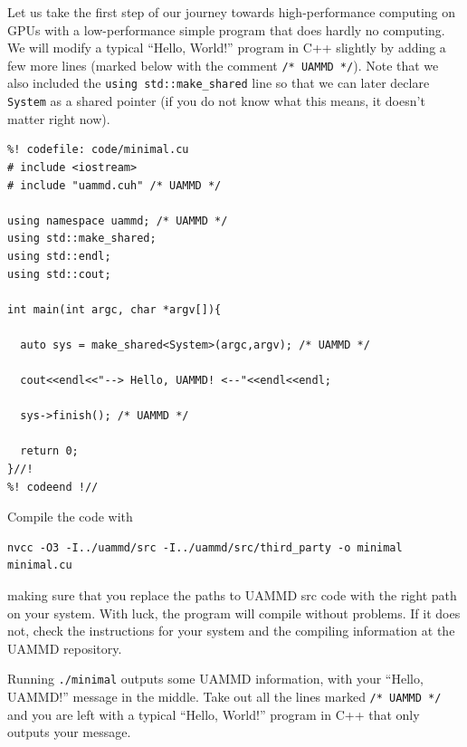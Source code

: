 
Let us take the first step of our journey towards high-performance computing on
GPUs with a low-performance simple program that does hardly no computing. We
will modify a typical ``Hello, World!'' program in C++ slightly by adding a few
more lines (marked below with the comment \texttt{/* UAMMD */}). Note that we
also included the \texttt{using std::make\_shared} line so that we can later
declare \texttt{System} as a shared pointer (if you do not know what this means,
it doesn't matter right now).
\begin{lstlisting}
%! codefile: code/minimal.cu
# include <iostream>
# include "uammd.cuh" /* UAMMD */

using namespace uammd; /* UAMMD */
using std::make_shared;
using std::endl;
using std::cout;

int main(int argc, char *argv[]){

  auto sys = make_shared<System>(argc,argv); /* UAMMD */

  cout<<endl<<"--> Hello, UAMMD! <--"<<endl<<endl;

  sys->finish(); /* UAMMD */

  return 0;
}//!
%! codeend !//
\end{lstlisting}
Compile the code with
\begin{verbatim}
nvcc -O3 -I../uammd/src -I../uammd/src/third_party -o minimal
minimal.cu
\end{verbatim}
making sure that you replace the paths to UAMMD src code with the right path on
your system. With luck, the program will compile without problems. If it does
not, check the instructions for your system and the compiling information at the
UAMMD repository.

Running \texttt{./minimal} outputs some UAMMD information, with your ``Hello, 
UAMMD!'' message in the middle. Take out all the lines marked \texttt{/* UAMMD 
*/} and you are left with a typical ``Hello, World!'' program in C++ that only 
outputs your message.

